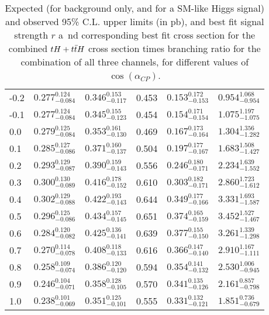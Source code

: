 \begin{table}[h!]
\begin{tabular}{l| ccc | cc}
    -0.2             & $0.277^{0.124}_{-0.084}$ & $0.346^{0.153}_{-0.117}$ & 0.453 & $0.153^{0.172}_{-0.153}$ & $0.954^{1.068}_{-0.954}$ \\
    -0.1             & $0.277^{0.124}_{-0.084}$ & $0.345^{0.155}_{-0.123}$ & 0.454 & $0.154^{0.171}_{-0.154}$ & $1.075^{1.197}_{-1.075}$ \\
    0.0              & $0.279^{0.125}_{-0.084}$ & $0.353^{0.161}_{-0.130}$ & 0.469 & $0.167^{0.173}_{-0.164}$ & $1.304^{1.356}_{-1.282}$ \\
    0.1              & $0.285^{0.127}_{-0.086}$ & $0.371^{0.160}_{-0.137}$ & 0.504 & $0.197^{0.177}_{-0.167}$ & $1.683^{1.508}_{-1.427}$ \\
    0.2              & $0.293^{0.129}_{-0.087}$ & $0.390^{0.159}_{-0.143}$ & 0.556 & $0.246^{0.180}_{-0.171}$ & $2.234^{1.639}_{-1.552}$ \\
    0.3              & $0.300^{0.130}_{-0.089}$ & $0.416^{0.178}_{-0.152}$ & 0.610 & $0.303^{0.182}_{-0.171}$ & $2.860^{1.723}_{-1.612}$ \\
    0.4              & $0.302^{0.129}_{-0.088}$ & $0.422^{0.193}_{-0.143}$ & 0.644 & $0.349^{0.177}_{-0.166}$ & $3.331^{1.693}_{-1.587}$ \\
    0.5              & $0.296^{0.125}_{-0.086}$ & $0.434^{0.157}_{-0.145}$ & 0.651 & $0.374^{0.165}_{-0.159}$ & $3.452^{1.527}_{-1.467}$ \\
    0.6              & $0.284^{0.120}_{-0.082}$ & $0.425^{0.136}_{-0.141}$ & 0.639 & $0.377^{0.155}_{-0.150}$ & $3.261^{1.339}_{-1.298}$ \\
    0.7              & $0.270^{0.114}_{-0.078}$ & $0.408^{0.118}_{-0.133}$ & 0.616 & $0.366^{0.147}_{-0.140}$ & $2.910^{1.167}_{-1.111}$ \\
    0.8              & $0.258^{0.109}_{-0.074}$ & $0.386^{0.120}_{-0.120}$ & 0.594 & $0.354^{0.141}_{-0.132}$ & $2.530^{1.006}_{-0.945}$ \\
    0.9              & $0.246^{0.104}_{-0.071}$ & $0.358^{0.128}_{-0.105}$ & 0.570 & $0.341^{0.135}_{-0.126}$ & $2.161^{0.857}_{-0.798}$ \\
    1.0              & $0.238^{0.101}_{-0.069}$ & $0.351^{0.125}_{-0.101}$ & 0.555 & $0.331^{0.132}_{-0.121}$ & $1.851^{0.736}_{-0.679}$ \\\hline
  \end{tabular}
  \caption[Expected and observed upper limits for CP-mixing angles.]{Expected (for background only, and for a SM-like Higgs signal) and observed 95\% C.L. upper limits (in pb), and best fit signal strength $r$ a\
    nd corresponding best fit cross section for the combined $tH+t\bar{t}H$ cross section times branching ratio for the combination of all three channels, for different values of $\cos(\alpha_{CP})$.}\label{tab:cp_xsec}
\end{table}
